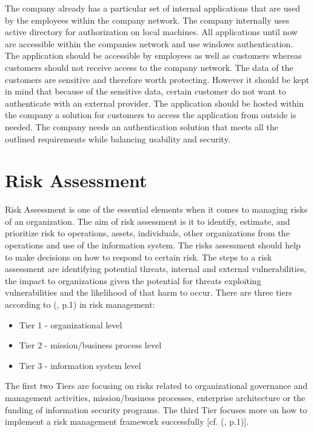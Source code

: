 The company already has a particular set of internal applications that are used by the employees within the company network. The company internally uses active directory for authorization on local machines. All applications until now are accessible within the companies network and use windows authentication. The application should be accessible by employees as well as customers whereas customers should not receive access to the company network. The data of the customers are sensitive and therefore worth protecting. However it should be kept in mind that because of the sensitive data, certain customer do not want to authenticate with an external provider. The application should be hosted within the company a solution for customers to access the application from outside is needed. The company needs an authentication solution that meets all the outlined requirements while balancing usability and security. 


\section{Risk Assessment}
\label{riskassessment}
Risk Assessment is one of the essential elements when it comes to managing risks of an organization. The aim of risk assessment is it to identify, estimate, and prioritize risk to operations, assets, individuals, other organizations from the operations and use of the information system. The risks assessment should help to make decisions on how to respond to certain risk. The steps to a risk assessment are identifying potential threats, internal and external vulnerabilities, the impact to organizations given the potential for threats exploiting vulnerabilities and the likelihood of that harm to occur. There are three tiers according to (\cite{NIST:2012:GCRA}, p.1) in risk management:

\begin{itemize}
	\item Tier 1 - organizational level
	\item Tier 2 - mission/business process level
	\item Tier 3 - information system level
\end{itemize}

The first two Tiers are focusing on risks related to organizational governance and management activities, mission/business processes, enterprise architecture or the funding of information security programs. The third Tier focuses more on how to implement a risk management framework successfully [cf. (\cite{NIST:2012:GCRA}, p.1)]. 

